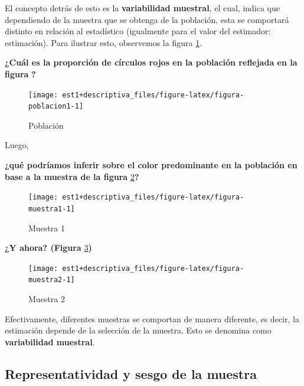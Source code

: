 \documentclass[
  11pt,
]{book}
\theoremstyle{definition}
\theoremstyle{definition}
\theoremstyle{definition}
\theoremstyle{definition}
\theoremstyle{remark}
\begin{document}
El concepto detrás de esto es la \textbf{variabilidad muestral}, el cual, indica que dependiendo de la muestra que se obtenga de la población, esta se comportará distinto en relación al estadístico (igualmente para el valor del estimador: estimación). Para ilustrar esto, observemos la figura \ref{fig:figura-poblacion1}.

\textbf{¿Cuál es la proporción de círculos rojos en la población reflejada en la figura} \textbf{?}

\begin{figure}

{\centering \texttt{[image: est1+descriptiva\_files/figure-latex/figura-poblacion1-1]} 

}

\caption{Población}\label{fig:figura-poblacion1}
\end{figure}

Luego,

\textbf{¿qué podríamos inferir sobre el color predominante en la población en base a la muestra de la figura} \ref{fig:figura-muestra1}\textbf{?}

\begin{figure}

{\centering \texttt{[image: est1+descriptiva\_files/figure-latex/figura-muestra1-1]} 

}

\caption{Muestra 1}\label{fig:figura-muestra1}
\end{figure}

\textbf{¿Y ahora? (Figura} \ref{fig:figura-muestra2}\textbf{)}

\begin{figure}

{\centering \texttt{[image: est1+descriptiva\_files/figure-latex/figura-muestra2-1]} 

}

\caption{Muestra 2}\label{fig:figura-muestra2}
\end{figure}

Efectivamente, diferentes muestras se comportan de manera diferente, es decir, la estimación depende de la selección de la muestra. Esto se denomina como \textbf{variabilidad muestral}.

\subsection{Representatividad y sesgo de la muestra}\label{topicos-conceptos-representatividad-sesgo}
\end{document}
